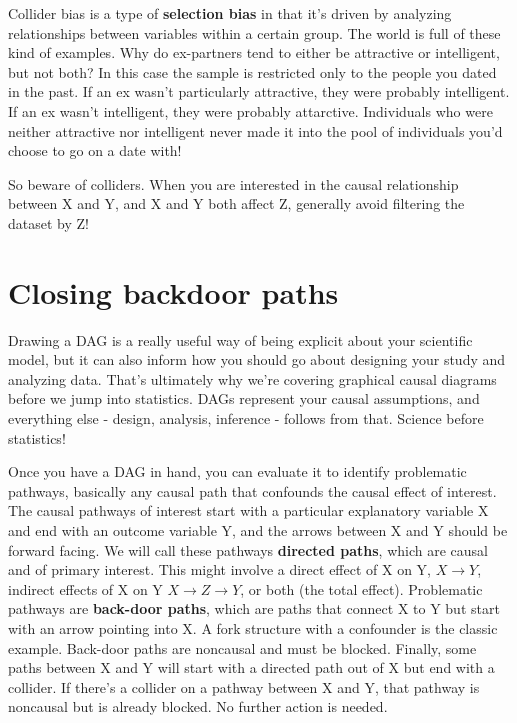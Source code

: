 \documentclass[
]{book}
\begin{document}
Collider bias is a type of \textbf{selection bias} in that it's driven by analyzing relationships between variables within a certain group. The world is full of these kind of examples. Why do ex-partners tend to either be attractive or intelligent, but not both? In this case the sample is restricted only to the people you dated in the past. If an ex wasn't particularly attractive, they were probably intelligent. If an ex wasn't intelligent, they were probably attarctive. Individuals who were neither attractive nor intelligent never made it into the pool of individuals you'd choose to go on a date with!

So beware of colliders. When you are interested in the causal relationship between X and Y, and X and Y both affect Z, generally avoid filtering the dataset by Z!

\section{Closing backdoor paths}\label{closing-backdoor-paths}

Drawing a DAG is a really useful way of being explicit about your scientific model, but it can also inform how you should go about designing your study and analyzing data. That's ultimately why we're covering graphical causal diagrams before we jump into statistics. DAGs represent your causal assumptions, and everything else - design, analysis, inference - follows from that. Science before statistics!

Once you have a DAG in hand, you can evaluate it to identify problematic pathways, basically any causal path that confounds the causal effect of interest. The causal pathways of interest start with a particular explanatory variable X and end with an outcome variable Y, and the arrows between X and Y should be forward facing. We will call these pathways \textbf{directed paths}, which are causal and of primary interest. This might involve a direct effect of X on Y, \(X \to Y\), indirect effects of X on Y \(X \to Z \to Y\), or both (the total effect). Problematic pathways are \textbf{back-door paths}, which are paths that connect X to Y but start with an arrow pointing into X. A fork structure with a confounder is the classic example. Back-door paths are noncausal and must be blocked. Finally, some paths between X and Y will start with a directed path out of X but end with a collider. If there's a collider on a pathway between X and Y, that pathway is noncausal but is already blocked. No further action is needed.
\end{document}
